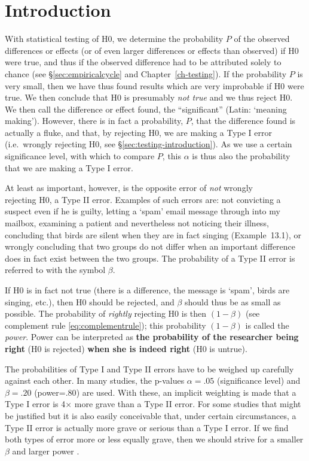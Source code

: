 \documentclass[
]{book}
\begin{document}
\hypertarget{sec:power-introduction}{%
\section{Introduction}\label{sec:power-introduction}}

With statistical testing of H0, we determine the probability \(P\) of the
observed differences or effects (or of even larger differences or effects
than observed) if H0 were true, and thus if
the observed difference had to be attributed solely to chance
(see §\ref{sec:empiricalcycle} and
Chapter~\ref{ch-testing}). If the probability \(P\) is very small, then
we have thus found results which are very improbable if H0 were true.
We then conclude that H0 is presumably \emph{not true} and we thus reject
H0. We then call the difference or effect found, the ``significant''
(Latin: `meaning making'). However, there is in fact a probability,
\(P\), that the difference found is actually a fluke, and that, by rejecting
H0, we are making a Type I error (i.e.~wrongly rejecting H0,
see
§\ref{sec:testing-introduction}). As we use a certain
significance level, with which to compare \(P\), this \(\alpha\)
is thus also the probability that we are making a Type I error.

At least as important, however, is the opposite error of \emph{not} wrongly\\
rejecting H0, a Type II error. Examples of such errors are:
not convicting a suspect even if he is guilty, letting a `spam'
email message through into my mailbox, examining a patient and nevertheless
not noticing their illness, concluding that birds are silent when
they are in fact singing
(Example~13.1), or wrongly concluding that two
groups do not differ when an important difference does in fact exist
between the two groups. The probability of a Type II error is referred to
with the symbol \(\beta\).

If H0 is in fact not true (there is a difference, the message is `spam',
birds are singing, etc.), then H0 should be rejected, and
\(\beta\) should thus be as small as possible. The probability of \emph{rightly}
rejecting H0 is then \((1-\beta)\) (see complement rule \eqref{eq:complementrule});
this probability \((1-\beta)\) is called the \emph{power}.
Power can be interpreted as \textbf{the probability of the researcher
being right} (H0 is rejected) \textbf{when she is indeed right} (H0 is untrue).

The probabilities of Type I and Type II errors have to be weighed up
carefully against each other. In many studies, the p-values
\(\alpha=.05\) (significance level) and \(\beta=.20\)
(power=\(.80\)) are used. With these, an implicit weighting is made
that a Type I error is 4× more grave than a Type II error.
For some studies that might be justified but it is also easily
conceivable that, under certain circumstances, a Type II error is
actually more grave or serious than a Type I error. If we find both types of
error more or less equally grave, then we should strive for
a smaller \(\beta\) and larger power \citep{Rose08}.
\end{document}
